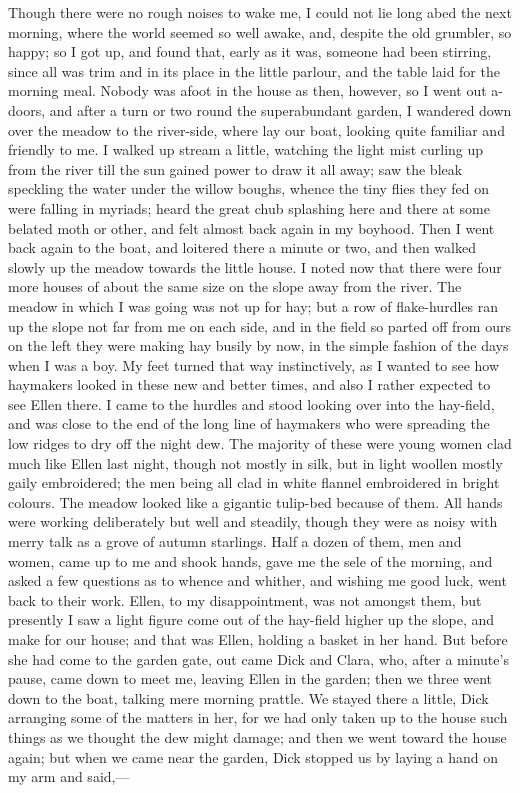 Though there were no rough noises to wake me, I could not lie long abed
the next morning, where the world seemed so well awake, and, despite the
old grumbler, so happy; so I got up, and found that, early as it was,
someone had been stirring, since all was trim and in its place in the
little parlour, and the table laid for the morning meal. Nobody was
afoot in the house as then, however, so I went out a-doors, and after a
turn or two round the superabundant garden, I wandered down over the
meadow to the river-side, where lay our boat, looking quite familiar and
friendly to me. I walked up stream a little, watching the light mist
curling up from the river till the sun gained power to draw it all away;
saw the bleak speckling the water under the willow boughs, whence the
tiny flies they fed on were falling in myriads; heard the great chub
splashing here and there at some belated moth or other, and felt almost
back again in my boyhood. Then I went back again to the boat, and
loitered there a minute or two, and then walked slowly up the meadow
towards the little house. I noted now that there were four more houses
of about the same size on the slope away from the river. The meadow in
which I was going was not up for hay; but a row of flake-hurdles ran up
the slope not far from me on each side, and in the field so parted off
from ours on the left they were making hay busily by now, in the simple
fashion of the days when I was a boy. My feet turned that way
instinctively, as I wanted to see how haymakers looked in these new and
better times, and also I rather expected to see Ellen there. I came to
the hurdles and stood looking over into the hay-field, and was close to
the end of the long line of haymakers who were spreading the low ridges
to dry off the night dew. The majority of these were young women clad
much like Ellen last night, though not mostly in silk, but in light
woollen mostly gaily embroidered; the men being all clad in white
flannel embroidered in bright colours. The meadow looked like a gigantic
tulip-bed because of them. All hands were working deliberately but well
and steadily, though they were as noisy with merry talk as a grove of
autumn starlings. Half a dozen of them, men and women, came up to me and
shook hands, gave me the sele of the morning, and asked a few questions
as to whence and whither, and wishing me good luck, went back to their
work. Ellen, to my disappointment, was not amongst them, but presently I
saw a light figure come out of the hay-field higher up the slope, and
make for our house; and that was Ellen, holding a basket in her hand.
But before she had come to the garden gate, out came Dick and Clara,
who, after a minute's pause, came down to meet me, leaving Ellen in the
garden; then we three went down to the boat, talking mere morning
prattle. We stayed there a little, Dick arranging some of the matters in
her, for we had only taken up to the house such things as we thought the
dew might damage; and then we went toward the house again; but when we
came near the garden, Dick stopped us by laying a hand on my arm and
said,---

